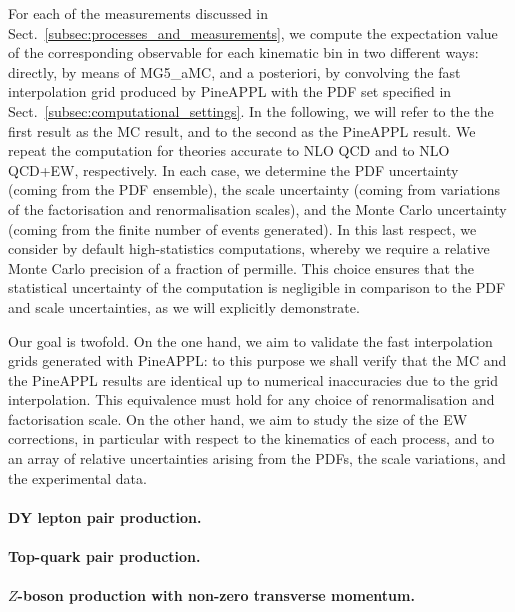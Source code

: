 For each of the measurements discussed in
Sect.~\ref{subsec:processes_and_measurements}, we compute the expectation
value of the corresponding observable for each kinematic bin in two different
ways: directly, by means of {\sc MG5\_aMC}, and a posteriori, by convolving the
fast interpolation grid produced by {\sc PineAPPL} with the PDF set specified
in Sect.~\ref{subsec:computational_settings}. In the following, we will refer
to the the first result as the {\sc MC} result, and to the second as the
{\sc PineAPPL} result. We repeat the computation for theories accurate to NLO
QCD and to NLO QCD+EW, respectively. In each case, we determine the PDF
uncertainty (coming from the PDF ensemble), the scale uncertainty (coming from
variations of the factorisation and renormalisation scales), and the Monte
Carlo uncertainty (coming from the finite number of events generated). In this
last respect, we consider by default high-statistics computations, whereby we
require a relative Monte Carlo precision of a fraction of permille. This choice
ensures that the statistical uncertainty of the computation is negligible
in comparison to the PDF and scale uncertainties, as we will explicitly
demonstrate.

Our goal is twofold. On the one hand, we aim to validate the fast interpolation
grids generated with {\sc PineAPPL}: to this purpose we shall verify that the
MC and the {\sc PineAPPL} results are identical up to numerical inaccuracies
due to the grid interpolation. This equivalence must hold for any choice of
renormalisation and factorisation scale. On the other hand, we aim to study
the size of the EW corrections, in particular with respect to the kinematics of
each process, and to an array of relative uncertainties arising from the PDFs,
the scale variations, and the experimental data.



\paragraph{DY lepton pair production.}


\paragraph{Top-quark pair production.}


\paragraph{$Z$-boson production with non-zero transverse momentum.}


